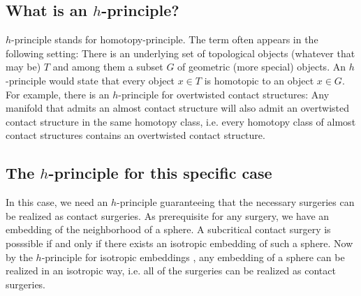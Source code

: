 
\subsection{What is an $h$-principle?}
$h$-principle stands for homotopy-principle. The term often appears in the following setting: There is an underlying set of topological objects (whatever that may be) $T$
and among them a subset $G$ of geometric (more special) objects. An $h$-principle would state that every object $x \in T$ is homotopic to an object $x \in G$.
For example, there is an $h$-principle for overtwisted contact structures: Any manifold that admits an almost contact structure will also admit an overtwisted
contact structure in the same homotopy class, i.e. every homotopy class of almost contact structures contains an overtwisted contact structure.


\subsection{The $h$-principle for this specific case}
In this case, we need an $h$-principle guaranteeing that the necessary surgeries can be realized as contact surgeries.
As prerequisite for any surgery, we have an embedding of the neighborhood of a sphere. 
A subcritical contact surgery is posssible if and only if there exists an isotropic embedding of such a sphere.
Now by the $h$-principle for isotropic embeddings \cite[section 12.4]{EM02}, any embedding of a sphere can be realized in an isotropic way,
i.e. all of the surgeries can be realized as contact surgeries.

